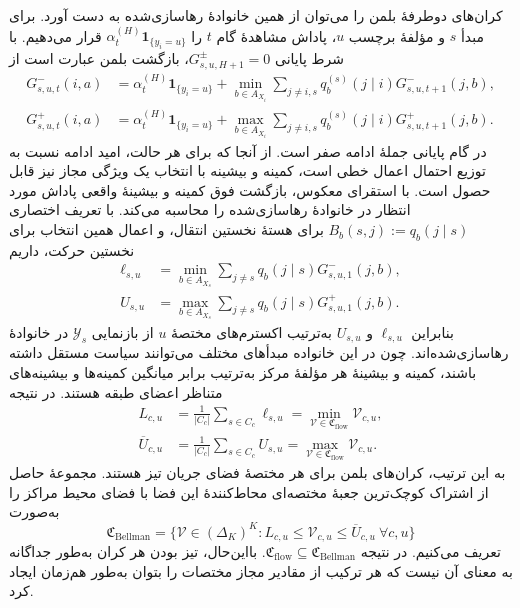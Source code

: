 کران‌های دوطرفهٔ بلمن را می‌توان از همین خانوادهٔ رهاسازی‌شده به دست آورد. برای مبدأ $s$ و مؤلفهٔ برچسب $u$، پاداش مشاهدهٔ گام $t$ را $\alpha_t^{(H)}\mathbf1_{\{y_i=u\}}$ قرار می‌دهیم. با شرط پایانی $G^{\pm}_{s,u,H+1}=0$، بازگشت بلمن عبارت است از
\begin{equation}\label{cmp:eq:ch3-bellman-value-recursion}
\begin{aligned}
G^-_{s,u,t}(i,a)&=\alpha_t^{(H)}\mathbf1_{\{y_i=u\}}+\min_{b\in A_{X_i}}\sum_{j\ne i,s}q_b^{(s)}(j\mid i)G^-_{s,u,t+1}(j,b),\\
G^+_{s,u,t}(i,a)&=\alpha_t^{(H)}\mathbf1_{\{y_i=u\}}+\max_{b\in A_{X_i}}\sum_{j\ne i,s}q_b^{(s)}(j\mid i)G^+_{s,u,t+1}(j,b).
\end{aligned}
\end{equation}
در گام پایانی جملهٔ ادامه صفر است. از آنجا که برای هر حالت، امید ادامه نسبت به توزیع احتمال اعمال خطی است، کمینه و بیشینه با انتخاب یک ویژگی مجاز نیز قابل حصول است. با استقرای معکوس، بازگشت فوق کمینه و بیشینهٔ واقعی پاداش مورد انتظار در خانوادهٔ رهاسازی‌شده را محاسبه می‌کند. با تعریف اختصاری $B_b(s,j):=q_b(j\mid s)$ برای هستهٔ نخستین انتقال، و اعمال همین انتخاب برای نخستین حرکت، داریم
\begin{equation}\label{cmp:eq:ch3-bellman-origin-bounds}
\begin{aligned}
\ell_{s,u}&=\min_{b\in A_{X_s}}\sum_{j\ne s}q_b(j\mid s)G^-_{s,u,1}(j,b),\\
U_{s,u}&=\max_{b\in A_{X_s}}\sum_{j\ne s}q_b(j\mid s)G^+_{s,u,1}(j,b).
\end{aligned}
\end{equation}
بنابراین $\ell_{s,u}$ و $U_{s,u}$ به‌ترتیب اکسترم‌های مختصهٔ $u$ از بازنمایی $\mathscr Y_s$ در خانوادهٔ رهاسازی‌شده‌اند. چون در این خانواده مبدأهای مختلف می‌توانند سیاست مستقل داشته باشند، کمینه و بیشینهٔ هر مؤلفهٔ مرکز به‌ترتیب برابر میانگین کمینه‌ها و بیشینه‌های متناظر اعضای طبقه هستند. در نتیجه
\begin{equation}\label{cmp:eq:ch3-center-component-upper}
\boxed{\begin{aligned}
L_{c,u}&=\frac1{|C_c|}\sum_{s\in C_c}\ell_{s,u}=\min_{\mathcal V\in\mathfrak C_{\mathrm{flow}}}\mathcal V_{c,u},\\
\overline U_{c,u}&=\frac1{|C_c|}\sum_{s\in C_c}U_{s,u}=\max_{\mathcal V\in\mathfrak C_{\mathrm{flow}}}\mathcal V_{c,u}.
\end{aligned}}
\end{equation}
به این ترتیب، کران‌های بلمن برای هر مختصهٔ فضای جریان تیز هستند. مجموعهٔ حاصل از اشتراک کوچک‌ترین جعبهٔ مختصه‌ای محاط‌کنندهٔ این فضا با فضای محیط مراکز را به‌صورت
\begin{equation}\label{cmp:eq:ch3-geometry-bellman-outer}
\mathfrak C_{\mathrm{Bellman}}=\{\mathcal V\in(\Delta_K)^K:L_{c,u}\le\mathcal V_{c,u}\le\overline U_{c,u}\ \forall c,u\}
\end{equation}
تعریف می‌کنیم. در نتیجه $\mathfrak C_{\mathrm{flow}}\subseteq\mathfrak C_{\mathrm{Bellman}}$. بااین‌حال، تیز بودن هر کران به‌طور جداگانه به معنای آن نیست که هر ترکیب از مقادیر مجاز مختصات را بتوان به‌طور هم‌زمان ایجاد کرد.

